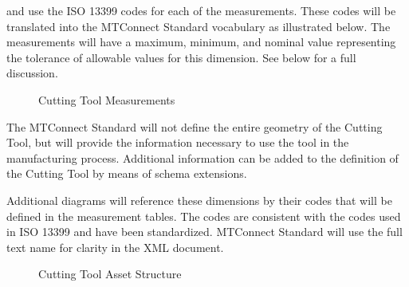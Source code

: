 \documentclass{mtconnect}	%
\begin{document}
 and  use the ISO 13399 codes for each of the measurements.  These codes will be translated into the MTConnect Standard vocabulary as illustrated below.  The measurements will have a maximum, minimum, and nominal value representing the tolerance of allowable values for this dimension.  See below for a full discussion.

\begin{figure}[ht]
  \centering
  \caption{Cutting Tool Measurements}
  \label{fig:cutting-tool-measurements}
\end{figure}

\FloatBarrier

The MTConnect Standard will not define the entire geometry of the Cutting Tool, but will provide the information necessary to use the tool in the manufacturing process.  Additional information can be added to the definition of the Cutting Tool by means of schema extensions.

Additional diagrams will reference these dimensions by their codes that will be defined in the measurement tables.  The codes are consistent with the codes used in ISO 13399 and have been standardized.  MTConnect Standard will use the full text name for clarity in the XML document. 

\begin{figure}[ht]
  \centering
  \caption{Cutting Tool Asset Structure}
  \label{fig:cutting-tool-asset-structure}
\end{figure}
\end{document}
